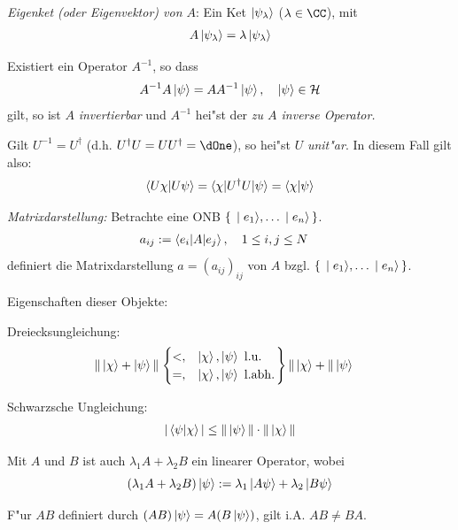 \documentclass[a4paper]{scrartcl}
\begin{document}
{\begin{1aufz}
\item \emph{Eigenket (oder Eigenvektor) von $A$}: Ein Ket $\Ket{ \psi_\lambda}$ ($\lambda \in \CC$), mit
\begin{align}
A \Ket{ \psi_\lambda} = \lambda \Ket{\psi_\lambda} \label{18}
\end{align}
\item Existiert ein Operator $A^{-1}$, so dass
\begin{align}
A^{-1} A \Ket{\psi} = A A^{-1} \Ket{\psi}, \quad \Ket{\psi } \in \mathcal{H}
\end{align}
gilt, so ist $A$ \emph{invertierbar} und $A^{-1}$ hei"st der \emph{zu $A$ inverse Operator.}
\item Gilt $U^{-1} = U^\dagger$ (d.h. $U^\dagger U = U U ^\dagger = \dOne$), so hei"st $U$ \emph{unit"ar}. In diesem Fall gilt also:
$$\braket{ U \chi | U \psi } = \braket{ \chi | U^\dagger U | \psi } = \braket{ \chi | \psi}$$
\item \emph{Matrixdarstellung:} Betrachte eine ONB $\set{ \ket {e_1}, \ldots \ket {e_n} }$.
\begin{align} a_{ij} & := \braket { e_i | A | e_j }, \quad 1 \leq i,j \leq N \end{align}
definiert die Matrixdarstellung $a = (a_{ij})_{ij}$ von $A$ bzgl. $\set{ \ket {e_1}, \ldots \ket {e_n} }$.
\end{1aufz}
Eigenschaften dieser Objekte:
\setcounter{equation}{21}
\begin{aaufz}
\item Dreiecksungleichung:
\setcounter{enumi}{1}
\begin{align}
\Vert \Ket{\chi} + \Ket{\psi} \Vert & \left. \begin{cases} <, & \ket{ \chi}, \ket{ \psi} \mathrm{\ l.u.}  \\ =, & \ket{\chi}, \ket{\psi} \mathrm{\ l.abh.} \end{cases} \right\} \Vert \Ket{\chi} + \Vert \Ket{\psi}
\end{align}
\item Schwarzsche Ungleichung:
\begin{align} \vert \braket{ \psi | \chi } \vert \leq \Vert \ket{ \psi } \Vert \cdot  \Vert \ket{\chi } \Vert \end{align}
\item Mit $A$ und $B$ ist auch $\lambda_1 A + \lambda_2 B$ ein linearer Operator, wobei
$$( \lambda_1 A + \lambda_2 B) \ket{ \psi } := \lambda_1 \ket{ A \psi} + \lambda_2 \ket{B \psi}$$
\item F"ur $AB$ definiert durch $(AB) \ket{ \psi} = A (B \ket \psi)$, gilt i.A. $AB \neq BA$.

\end{aaufz}}
\end{document}
